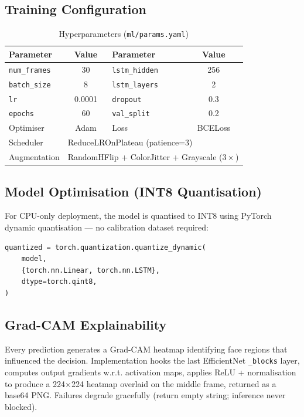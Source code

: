 \documentclass[conference]{IEEEtran}
\begin{document}
\subsection{Training Configuration}

\begin{table}[H]
\centering
\caption{Hyperparameters (\texttt{ml/params.yaml})}
\label{tab:hp}
\begin{tabular}{@{}lclc@{}}
\toprule
\textbf{Parameter} & \textbf{Value} & \textbf{Parameter} & \textbf{Value} \\
\midrule
\texttt{num\_frames}  & 30      & \texttt{lstm\_hidden} & 256 \\
\texttt{batch\_size}  & 8       & \texttt{lstm\_layers} & 2 \\
\texttt{lr}           & 0.0001  & \texttt{dropout}      & 0.3 \\
\texttt{epochs}       & 60      & \texttt{val\_split}   & 0.2 \\
Optimiser             & Adam    & Loss                  & BCELoss \\
Scheduler   & \multicolumn{3}{l}{ReduceLROnPlateau (patience=3)} \\
Augmentation & \multicolumn{3}{l}{RandomHFlip + ColorJitter + Grayscale ($3\times$)} \\
\bottomrule
\end{tabular}
\end{table}

\subsection{Model Optimisation (INT8 Quantisation)}

For CPU-only deployment, the model is quantised to INT8 using PyTorch dynamic quantisation — no calibration dataset required:

\begin{lstlisting}[language=Python, caption={INT8 Quantisation (ml/quantize.py)}]
quantized = torch.quantization.quantize_dynamic(
    model,
    {torch.nn.Linear, torch.nn.LSTM},
    dtype=torch.qint8,
)
\end{lstlisting}

\subsection{Grad-CAM Explainability}

Every prediction generates a Grad-CAM heatmap identifying face regions that influenced the decision. Implementation hooks the last EfficientNet \texttt{\_blocks} layer, computes output gradients w.r.t. activation maps, applies ReLU + normalisation to produce a 224$\times$224 heatmap overlaid on the middle frame, returned as a base64 PNG. Failures degrade gracefully (return empty string; inference never blocked).
\end{document}
